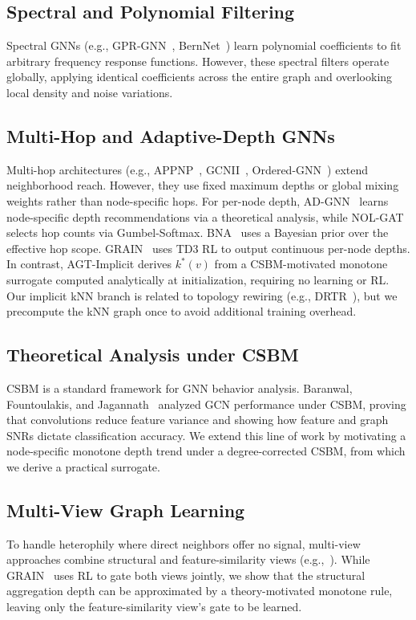 \documentclass[letterpaper]{article}
\begin{document}
\subsection{Spectral and Polynomial Filtering}
Spectral GNNs (e.g., GPR-GNN~\cite{gprgnn2021}, BernNet~\cite{bernnet2021}) learn polynomial coefficients to fit arbitrary frequency response functions. However, these spectral filters operate globally, applying identical coefficients across the entire graph and overlooking local density and noise variations.

\subsection{Multi-Hop and Adaptive-Depth GNNs}
Multi-hop architectures (e.g., APPNP~\cite{appnp2019}, GCNII~\cite{chen2020gcnii}, Ordered-GNN~\cite{orderedgnn2023}) extend neighborhood reach. However, they use fixed maximum depths or global mixing weights rather than node-specific hops.
For per-node depth, AD-GNN~\cite{adgnn2025} learns node-specific depth recommendations via a theoretical analysis, while NOL-GAT~\cite{nolgat2025} selects hop counts via Gumbel-Softmax. BNA~\cite{bna2026} uses a Bayesian prior over the effective hop scope. GRAIN~\cite{grain2025} uses TD3 RL to output continuous per-node depths. In contrast, AGT-Implicit derives $k^*(v)$ from a CSBM-motivated monotone surrogate computed analytically at initialization, requiring no learning or RL.
Our implicit kNN branch is related to topology rewiring (e.g., DRTR~\cite{drtr2024}), but we precompute the kNN graph once to avoid additional training overhead.

\subsection{Theoretical Analysis under CSBM}
CSBM is a standard framework for GNN behavior analysis. Baranwal, Fountoulakis, and Jagannath~\cite{baranwal2022gcn, baranwal2023} analyzed GCN performance under CSBM, proving that convolutions reduce feature variance and showing how feature and graph SNRs dictate classification accuracy. We extend this line of work by motivating a node-specific monotone depth trend under a degree-corrected CSBM, from which we derive a practical surrogate.

\subsection{Multi-View Graph Learning}
To handle heterophily where direct neighbors offer no signal, multi-view approaches combine structural and feature-similarity views (e.g.,~\cite{klicpera2019diffusion}). While GRAIN~\cite{grain2025} uses RL to gate both views jointly, we show that the structural aggregation depth can be approximated by a theory-motivated monotone rule, leaving only the feature-similarity view's gate to be learned.
\end{document}

